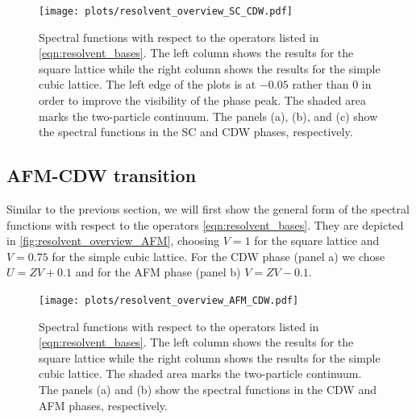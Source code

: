 \documentclass[
    reprint, 
    aps,
    preprintnumbers,
    twocolumn,
    prb,
    superscriptaddress
]{revtex4-2}
\begin{document}
\begin{figure}
    \centering
    \texttt{[image: plots/resolvent\_overview\_SC\_CDW.pdf]}
    \caption{Spectral functions with respect to the operators listed in \eqref{eqn:resolvent_bases}.
    The left column shows the results for the square lattice while the right column shows the results for the simple cubic lattice.
    The left edge of the plots is at $-0.05$ rather than $0$ in order to improve the visibility of the phase peak.
    The shaded area marks the two-particle continuum.
    The panels (a), (b), and (c) show the spectral functions in the SC and CDW phases, respectively.}
    \label{fig:resolvent_overview_SC}
\end{figure}

\subsection{AFM-CDW transition}

Similar to the previous section, we will first show the general form of the spectral functions with respect to the operators \eqref{eqn:resolvent_bases}.
They are depicted in \autoref{fig:resolvent_overview_AFM}, choosing $V=1$ for the square lattice and $V=0.75$ for the simple cubic lattice.
For the CDW phase (panel a) we chose $U=ZV + 0.1$ and for the AFM phase (panel b) $V=ZV - 0.1$.

\begin{figure}
    \centering
    \texttt{[image: plots/resolvent\_overview\_AFM\_CDW.pdf]}
    \caption{Spectral functions with respect to the operators listed in \eqref{eqn:resolvent_bases}.
    The left column shows the results for the square lattice while the right column shows the results for the simple cubic lattice.
    The shaded area marks the two-particle continuum.
    The panels (a) and (b) show the spectral functions in the CDW and AFM phases, respectively.}
    \label{fig:resolvent_overview_AFM}
\end{figure}

\end{document}
